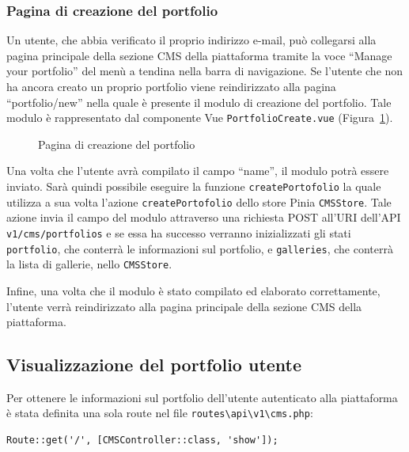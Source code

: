 \subsubsection{Pagina di creazione del portfolio}
Un utente, che abbia verificato il proprio indirizzo e-mail, pu\`o collegarsi alla pagina principale della sezione CMS della piattaforma tramite la voce ``Manage your portfolio'' del men\`u a tendina nella barra di navigazione. Se l'utente che non ha ancora creato un proprio portfolio viene reindirizzato alla pagina ``portfolio/new'' nella quale \`e presente il modulo di creazione del portfolio. Tale modulo \`e rappresentato dal componente Vue \verb|PortfolioCreate.vue| (Figura~\ref{fig:pagina_creazione_portfolio}). 

\begin{figure}[htbp]
	\centering
	\fboxsep=0.5pt
	\fboxrule=0.5pt
	\caption{Pagina di creazione del portfolio}
	\label{fig:pagina_creazione_portfolio}
\end{figure}

Una volta che l'utente avr\`a compilato il campo ``name'', il modulo potr\`a essere inviato. Sar\`a quindi possibile eseguire la funzione \verb|createPortofolio| la quale utilizza a sua volta l'azione \verb|createPortofolio| dello store Pinia \verb|CMSStore|. Tale azione invia il campo del modulo attraverso una richiesta POST all'URI dell'API \verb|v1/cms/portfolios| e se essa ha successo verranno inizializzati gli stati \verb|portfolio|, che conterr\`a le informazioni sul portfolio, e \verb|galleries|, che conterr\`a la lista di gallerie, nello \verb|CMSStore|.

Infine, una volta che il modulo \`e stato compilato ed elaborato correttamente, l'utente verr\`a reindirizzato alla pagina principale della sezione CMS della piattaforma.

\subsection{Visualizzazione del portfolio utente}
Per ottenere le informazioni sul portfolio dell'utente autenticato alla piattaforma \`e stata definita una sola route nel file \verb|routes\api\v1\cms.php|:
\begin{lstlisting}[caption={Route per ottenere il portfolio dell'utente autenticato}, label={lst:route_logout}]
Route::get('/', [CMSController::class, 'show']);
\end{lstlisting}

